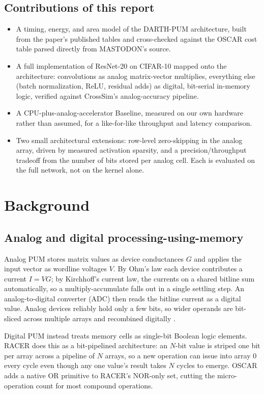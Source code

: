\documentclass[conference]{IEEEtran}
\begin{document}
\subsection{Contributions of this report}

\begin{itemize}
\item A timing, energy, and area model of the DARTH-PUM architecture, built
  from the paper's published tables and cross-checked against the OSCAR
  cost table parsed directly from MASTODON's source.
\item A full implementation of ResNet-20 on CIFAR-10 mapped onto the
  architecture: convolutions as analog matrix-vector multiplies, everything
  else (batch normalization, ReLU, residual adds) as digital, bit-serial
  in-memory logic, verified against CrossSim's analog-accuracy pipeline.
\item A CPU-plus-analog-accelerator Baseline, measured on our own hardware
  rather than assumed, for a like-for-like throughput and latency
  comparison.
\item Two small architectural extensions: row-level zero-skipping in the
  analog array, driven by measured activation sparsity, and a
  precision/throughput tradeoff from the number of bits stored per analog
  cell. Each is evaluated on the full network, not on the kernel alone.
\end{itemize}

\section{Background}
\label{sec:background}

\subsection{Analog and digital processing-using-memory}

Analog PUM stores matrix values as device conductances $G$ and applies the
input vector as wordline voltages $V$. By Ohm's law each device contributes
a current $I = VG$; by Kirchhoff's current law, the currents on a shared
bitline sum automatically, so a multiply-accumulate falls out in a single
settling step. An analog-to-digital converter (ADC) then reads the bitline
current as a digital value. Analog devices reliably hold only a few bits, so
wider operands are bit-sliced across multiple arrays and recombined
digitally \cite{darthpum}.

Digital PUM instead treats memory cells as single-bit Boolean logic
elements. RACER \cite{racer} does this as a bit-pipelined architecture: an
$N$-bit value is striped one bit per array across a pipeline of $N$ arrays,
so a new operation can issue into array 0 every cycle even though any one
value's result takes $N$ cycles to emerge. OSCAR \cite{oscar} adds a native
OR primitive to RACER's NOR-only set, cutting the micro-operation count for
most compound operations.
\end{document}
